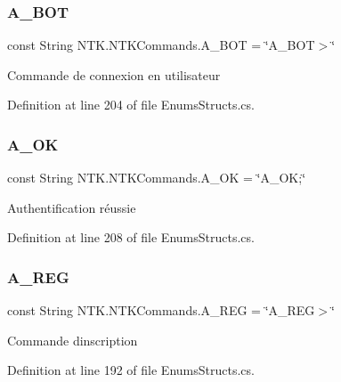 \subsubsection{\texorpdfstring{A\_BOT}{A\_BOT}}
{\footnotesize\ttfamily const String N\+T\+K.\+N\+T\+K\+Commands.\+A\+\_\+\+B\+OT = \char`\"{}A\+\_\+\+B\+OT$>$\char`\"{}}



Commande de connexion en utilisateur 



Definition at line 204 of file Enums\+Structs.\+cs.

\mbox{\label{struct_n_t_k_1_1_n_t_k_commands_ad5a9316dcec895692e66e6cc5d98200e}} 
\subsubsection{\texorpdfstring{A\_OK}{A\_OK}}
{\footnotesize\ttfamily const String N\+T\+K.\+N\+T\+K\+Commands.\+A\+\_\+\+OK = \char`\"{}A\+\_\+\+OK;\char`\"{}}



Authentification réussie 



Definition at line 208 of file Enums\+Structs.\+cs.

\mbox{\label{struct_n_t_k_1_1_n_t_k_commands_a0625831eeedafd85d45682c4e41c5ba2}} 
\subsubsection{\texorpdfstring{A\_REG}{A\_REG}}
{\footnotesize\ttfamily const String N\+T\+K.\+N\+T\+K\+Commands.\+A\+\_\+\+R\+EG = \char`\"{}A\+\_\+\+R\+EG$>$\char`\"{}}



Commande d\textquotesingle{}inscription 



Definition at line 192 of file Enums\+Structs.\+cs.

\mbox{\label{struct_n_t_k_1_1_n_t_k_commands_a6c9a7bfbb102e3affa71cf60ab1d3a7c}} 
